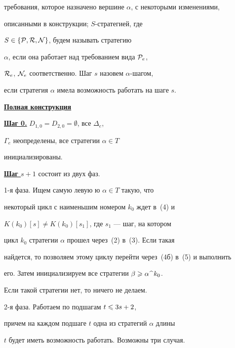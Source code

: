 требования, которое назначено вершине $\alpha$, с некоторыми изменениями,


описанными в конструкции; $S$-стратегией, где


$S\in\{{\cal P},{\cal R},{\cal N}\}$, будем называть стратегию 


$\alpha$, если она работает над требованием вида ${\cal P}_e$, 


${\cal R}_e$, ${\cal N}_e$ соответственно. Шаг $s$ назовем $\alpha$-шагом, 


если стратегия $\alpha$ имела возможность работать на шаге $s$.





\bigskip


\underline{\bf Полная конструкция}


\medskip





\noindent\underline{\bf Шаг 0.} $D_{1,0}= D_{2,0}=\emptyset$, все $\Delta_e$,


$\Gamma_e$ неопределены, все стратегии $\alpha\in T$


инициализированы.





\noindent\underline{\bf Шаг $s+1$} состоит из двух фаз.





1-я фаза. Ищем самую левую ю $\alpha\in T$ такую, что


некоторый цикл с наименьшим номером $k_0$ ждет в~(4) и 


$K(k_0)[s]\ne K(k_0)[s_1]$, где $s_1$ --- шаг, на котором 


цикл $k_0$ стратегии $\alpha$ прошел через~(2) в~(3). Если такая 


найдется, то позволяем этому циклу перейти через~(4б) в~(5) и выполнить


его. Затем инициализируем все стратегии $\beta\geqslant\alpha\,\widehat{\ }\,k_0$.


Если такой стратегии нет, то ничего не делаем.





2-я фаза. Работаем по подшагам $t\leqslant 3s+2$,


причем на каждом подшаге $t$ одна из стратегий $\alpha$ длины


$t$ будет иметь возможность работать. Возможны три случая.



